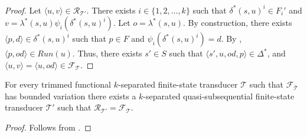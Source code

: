 \begin{proof}
  Let $\langle u, v \rangle \in \mathcal{R}_{\mathcal{T}'}$. There exists $i \in \{ 1,
  2, \ldots, k \}$ such that $\delta^*(s, u)^i \in F_i'$ and $v = \lambda^*(s, u)
  \psi_i(\delta^*(s, u)^i)$. Let $o = \lambda^*(s, u)$. By construction, there exists
  $\langle p, d \rangle \in \delta^*(s, u)^i$ such that $p \in F$ and
  $\psi_i(\delta^*(s, u)^i) = d$. By , $\langle p, od
  \rangle \in Run(u)$. Thus, there exists $s' \in S$ such that $\langle s', u, od, p
  \rangle \in \Delta^*$, and $\langle u, v \rangle = \langle u, od \rangle \in
  \mathcal{F}_\mathcal{T}$.
\end{proof}

\begin{theorem}
  For every trimmed functional $k$-separated finite-state transducer $\mathcal{T}$
  such that $\mathcal{F}_\mathcal{T}$ has bounded variation there exists a
  $k$-separated quasi-subsequential finite-state transducer $\mathcal{T'}$ such that
  $\mathcal{R}_{\mathcal{T}'} = \mathcal{F}_\mathcal{T}$.
\end{theorem}

\begin{proof}
  Follows from .
\end{proof}
